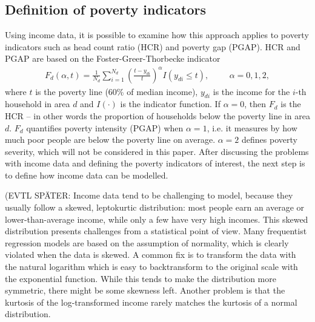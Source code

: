 \subsection{Definition of poverty indicators}


Using income data, it is possible to examine how this approach applies to poverty indicators such as head count ratio (HCR) and poverty gap (PGAP). HCR and PGAP are based on the Foster-Greer-Thorbecke indicator \citep{foster_class_1984}
\begin{gather*}
   F_d(\alpha, t) = \displaystyle \frac 1 {N_d} \sum_{i=1}^{N_d}\left( \frac{t - y_{di}}{t} \right)^\alpha I (y_{di} \le t),
   \hspace{1cm}\alpha = 0, 1, 2,
\end{gather*}
where $t$ is the poverty line (60\% of median income), $y_{di}$ is the income for the $i$-th household in area $d$ and $I(\cdot)$ is the indicator function. If $\alpha = 0$, then $F_d$ is the HCR – in other words the proportion of households below the poverty line in area $d$. $F_d$ quantifies poverty intensity (PGAP) when $\alpha = 1$, i.e. it measures by how much poor people are below the poverty line on average. $\alpha = 2$ defines poverty severity, which will not be considered in this paper. After discussing the problems with income data and defining the poverty indicators of interest, the next step is to define how income data can be modelled.

(EVTL SPÄTER: Income data tend to be challenging to model, because they usually follow a skewed, leptokurtic distribution: most people earn an average or lower-than-average income, while only a few have very high incomes. This skewed distribution presents challenges from a statistical point of view. Many frequentist regression models are based on the assumption of normality, which is clearly violated when the data is skewed.
A common fix is to transform the data with the natural logarithm which is easy to backtransform to the original scale with the exponential function. While this tends to make the distribution more symmetric, there might be some skewness left. Another problem is that the kurtosis of the log-transformed income rarely matches the kurtosis of a normal distribution.

